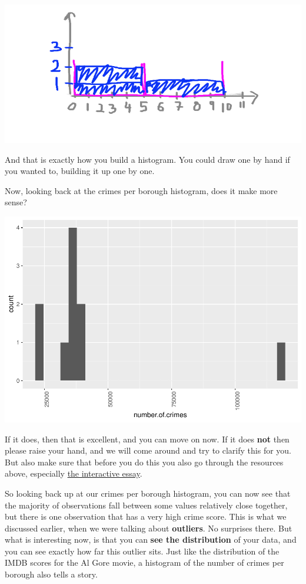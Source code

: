 \documentclass[
]{book}
\begin{document}
\includegraphics{imgs/hist_fill_3.png}

And that is exactly how you build a histogram. You could draw one by hand if you wanted to, building it up one by one.

Now, looking back at the crimes per borough histogram, does it make more sense?

\includegraphics{bookdown-demo_files/figure-latex/unnamed-chunk-20-1.pdf}

If it does, then that is excellent, and you can move on now. If it does \textbf{not} then please raise your hand, and we will come around and try to clarify this for you. But also make sure that before you do this you also go through the resources above, especially \href{http://tinlizzie.org/histograms/}{the interactive essay}.

So looking back up at our crimes per borough histogram, you can now see that the majority of observations fall between some values relatively close together, but there is one observation that has a very high crime score. This is what we discussed earlier, when we were talking about \textbf{outliers}. No surprises there. But what is interesting now, is that you can \textbf{see the distribution} of your data, and you can see exactly how far this outlier sits. Just like the distribution of the IMDB scores for the Al Gore movie, a histogram of the number of crimes per borough also tells a story.
\end{document}
